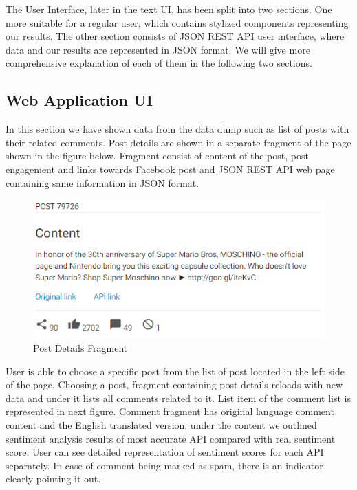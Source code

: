 The User Interface, later in the text UI, has been split into two sections. One more suitable for a regular user, which contains stylized components representing our results. The other section consists of JSON REST API user interface, where data and our results are represented in JSON format. We will give more comprehensive explanation of each of them in the following two sections.

\subsection{Web Application UI}

In this section we have shown data from the data dump such as list of posts with their related comments. Post details are shown in a separate fragment of the page shown in the figure below. Fragment consist of content of the post, post engagement and links towards Facebook post and JSON REST API web page containing same information in JSON format.

\begin{figure}[ht]
	\centering	
	\includegraphics[width=1\textwidth]{04-framework/03-user-interface/images/post_details.png}
	\caption[Post Details Fragment]{Post Details Fragment \label{fig:post-details}}
\end{figure}
 
User is able to choose a specific post from the list of post located in the left side of the page. Choosing a post, fragment containing post details reloads with new data and under it lists all comments related to it. List item of the comment list is represented in next figure. Comment fragment has original language comment content and the English translated version, under the content we outlined sentiment analysis results of most accurate API compared with real sentiment score. User can see detailed representation of sentiment scores for each API separately. In case of comment being marked as spam, there is an indicator clearly pointing it out.

